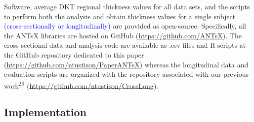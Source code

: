 \documentclass[12pt,]{article}
\begin{document}
Software, average DKT regional thickness values for all data sets, and
the scripts to perform both the analysis and obtain thickness values for
a single subject \textcolor{blue}{(cross-sectionally or longitudinally)}
are provided as open-source. Specifically, all the ANTsX libraries are
hosted on GitHub (\url{https://github.com/ANTsX}). The cross-sectional
data and analysis code are available as .csv files and R scripts at the
GitHub repository dedicated to this paper
(\url{https://github.com/ntustison/PaperANTsX}) whereas the longitudinal
data and evaluation scripts are organized with the repository associated
with our previous work\textsuperscript{29}
(\url{https://github.com/ntustison/CrossLong}).

\hypertarget{implementation}{%
\subsection*{Implementation}\label{implementation}}

\vspace{10mm}

\end{document}
